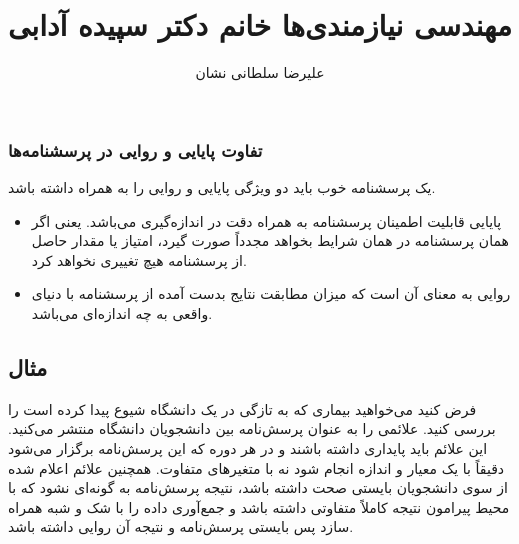 \documentclass[a5paper]{article}
\title{مهندسی نیازمندی‌ها خانم دکتر سپیده آدابی}
\author{علیرضا سلطانی نشان}
\begin{document}
\maketitle
\subsubsection*{تفاوت پایایی و روایی در پرسشنامه‌ها}

یک پرسشنامه خوب باید دو ویژگی پایایی و روایی را به همراه داشته باشد. 

\begin{itemize}
    \item پایایی قابلیت اطمینان پرسشنامه به همراه دقت در اندازه‌گیری می‌باشد.
    یعنی اگر همان پرسشنامه در همان شرایط بخواهد مجدداً صورت گیرد، امتیاز یا
    مقدار حاصل از پرسشنامه هیچ تغییری نخواهد کرد.
    \item روایی به معنای آن است که میزان مطابقت نتایج بدست آمده از پرسشنامه با
    دنیای واقعی به چه اندازه‌ای می‌باشد.
\end{itemize}

\subsection*{مثال}

فرض کنید می‌خواهید بیماری که به تازگی در یک دانشگاه شیوع پیدا کرده است را بررسی
کنید. علائمی را به عنوان پرسش‌نامه بین دانشجویان دانشگاه منتشر می‌کنید. این
علائم باید پایداری داشته باشند و در هر دوره که این پرسش‌نامه برگزار می‌شود
دقیقاً با یک معیار و اندازه انجام شود نه با متغیر‌های متفاوت. همچنین علائم اعلام
شده از سوی دانشجویان بایستی صحت داشته باشد، نتیجه پرسش‌نامه به گونه‌ای نشود که
با محیط پیرامون نتیجه کاملاً متفاوتی داشته باشد و جمع‌آوری داده را با شک و شبه
همراه سازد پس بایستی پرسش‌نامه و نتیجه آن روایی داشته باشد.
\end{document}
